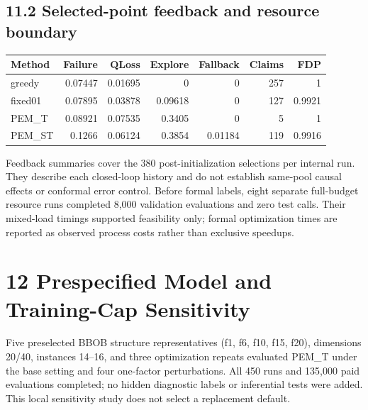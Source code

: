 \documentclass[11pt,a4paper]{article}
\begin{document}
\hypertarget{selected-point-feedback-and-resource-boundary}{%
\subsection{11.2 Selected-point feedback and resource
boundary}\label{selected-point-feedback-and-resource-boundary}}

\par\noindent\begin{minipage}{\linewidth}

\begin{longtable}[]{@{}lrrrrrr@{}}
\toprule
Method & Failure & QLoss & Explore & Fallback & Claims & FDP \\
\midrule
\endhead
greedy & 0.07447 & 0.01695 & 0 & 0 & 257 & 1 \\
fixed01 & 0.07895 & 0.03878 & 0.09618 & 0 & 127 & 0.9921 \\
PEM\_T & 0.08921 & 0.07535 & 0.3405 & 0 & 5 & 1 \\
PEM\_ST & 0.1266 & 0.06124 & 0.3854 & 0.01184 & 119 & 0.9916 \\
\bottomrule
\end{longtable}

\end{minipage}\par

Feedback summaries cover the 380 post-initialization selections per
internal run. They describe each closed-loop history and do not
establish same-pool causal effects or conformal error control. Before
formal labels, eight separate full-budget resource runs completed 8,000
validation evaluations and zero test calls. Their mixed-load timings
supported feasibility only; formal optimization times are reported as
observed process costs rather than exclusive speedups.

\hypertarget{prespecified-model-and-training-cap-sensitivity}{%
\section{12 Prespecified Model and Training-Cap
Sensitivity}\label{prespecified-model-and-training-cap-sensitivity}}

Five preselected BBOB structure representatives (f1, f6, f10, f15, f20),
dimensions 20/40, instances 14--16, and three optimization repeats
evaluated PEM\_T under the base setting and four one-factor
perturbations. All 450 runs and 135,000 paid evaluations completed; no
hidden diagnostic labels or inferential tests were added. This local
sensitivity study does not select a replacement default.
\end{document}
